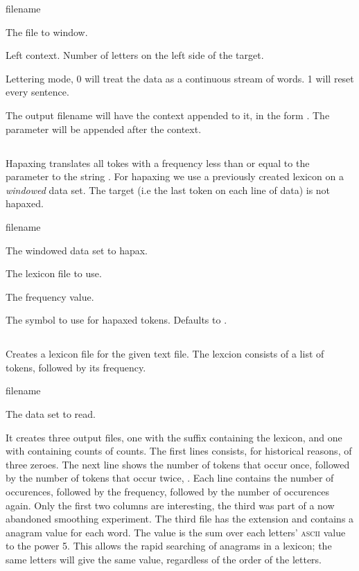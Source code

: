 \documentclass[a4paper,10pt,twoside]{report}
\begin{document}
\begin{varlist}{filename}
\item[filename] The file to window.
\item[lc] Left context. Number of letters on the left side of the target.
\item[lm] Lettering mode, 0 will treat the data as a continuous stream of
  words. 1 will reset every sentence.
\end{varlist}

The output filename will have the context appended to it, in the form
. The  parameter will be appended after the context.

\subsection{}

Hapaxing translates all tokes with a frequency less than or equal to
the  parameter to the string . For hapaxing we use
a previously created lexicon on a \emph{windowed} data set. The target
(i.e the last token on each line of data) is not hapaxed.

\begin{varlist}{filename}
\item[filename] The windowed data set to hapax.
\item[lexicon] The lexicon file to use.
\item[hpx] The frequency value.
\item[hpx\_sym] The symbol to use for hapaxed tokens. Defaults to
  . 
\end{varlist}

\subsection{}

Creates a lexicon file for the given text file. The lexcion consists
of a list of tokens, followed by its frequency.

\begin{varlist}{filename}
\item[filename] The data set to read.
\end{varlist}

It creates three output files, one with the suffix 
containing the lexicon, and one with  containing counts of
counts. The first lines consists, for historical reasons, of three 
zeroes. The next line shows the number of tokens that occur once,
followed by the number of tokens that occur twice, \etc{}. Each line
contains the number of occurences, followed by the frequency, followed
by the number of occurences again. Only the first two columns are
interesting, the third was part of a now abandoned smoothing experiment.
The third file has the extension  and contains a
anagram value for each word. The value is the sum over each letters'
\textsc{ascii} value to the power 5. This allows the rapid searching
of anagrams in a lexicon; the same letters will give the same value,
regardless of the order of the letters.
\end{document}
